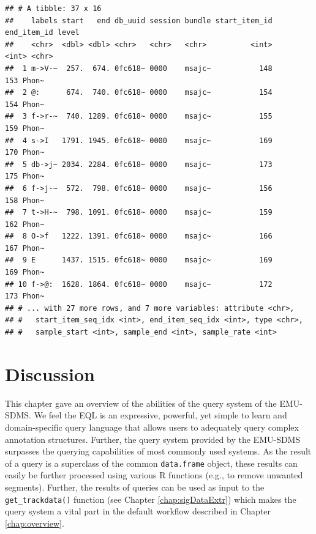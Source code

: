 \documentclass[]{book}
\begin{document}
\begin{verbatim}
## # A tibble: 37 x 16
##    labels start   end db_uuid session bundle start_item_id end_item_id level
##    <chr>  <dbl> <dbl> <chr>   <chr>   <chr>          <int>       <int> <chr>
##  1 m->V-~  257.  674. 0fc618~ 0000    msajc~           148         153 Phon~
##  2 @:      674.  740. 0fc618~ 0000    msajc~           154         154 Phon~
##  3 f->r-~  740. 1289. 0fc618~ 0000    msajc~           155         159 Phon~
##  4 s->I   1791. 1945. 0fc618~ 0000    msajc~           169         170 Phon~
##  5 db->j~ 2034. 2284. 0fc618~ 0000    msajc~           173         175 Phon~
##  6 f->j-~  572.  798. 0fc618~ 0000    msajc~           156         158 Phon~
##  7 t->H-~  798. 1091. 0fc618~ 0000    msajc~           159         162 Phon~
##  8 O->f   1222. 1391. 0fc618~ 0000    msajc~           166         167 Phon~
##  9 E      1437. 1515. 0fc618~ 0000    msajc~           169         169 Phon~
## 10 f->@:  1628. 1864. 0fc618~ 0000    msajc~           172         173 Phon~
## # ... with 27 more rows, and 7 more variables: attribute <chr>,
## #   start_item_seq_idx <int>, end_item_seq_idx <int>, type <chr>,
## #   sample_start <int>, sample_end <int>, sample_rate <int>
\end{verbatim}

\hypertarget{discussion}{%
\section{Discussion}\label{discussion}}

This chapter gave an overview of the abilities of the query system of the EMU-SDMS. We feel the EQL is an expressive, powerful, yet simple to learn and domain-specific query language that allows users to adequately query complex annotation structures. Further, the query system provided by the EMU-SDMS surpasses the querying capabilities of most commonly used systems. As the result of a query is a superclass of the common \texttt{data.frame} object, these results can easily be further processed using various R functions (e.g., to remove unwanted segments). Further, the results of queries can be used as input to the \texttt{get\_trackdata()} function (see Chapter \ref{chap:sigDataExtr}) which makes the query system a vital part in the default workflow described in Chapter \ref{chap:overview}.
\end{document}
